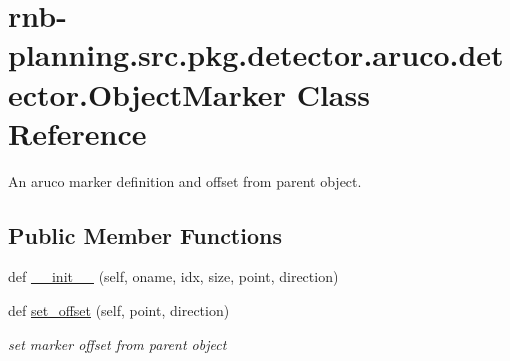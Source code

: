 \hypertarget{classrnb-planning_1_1src_1_1pkg_1_1detector_1_1aruco_1_1detector_1_1_object_marker}{}\section{rnb-\/planning.src.\+pkg.\+detector.\+aruco.\+detector.\+Object\+Marker Class Reference}
\label{classrnb-planning_1_1src_1_1pkg_1_1detector_1_1aruco_1_1detector_1_1_object_marker}


An aruco marker definition and offset from parent object.  


\subsection*{Public Member Functions}
\begin{DoxyCompactItemize}
\item 
def \hyperlink{classrnb-planning_1_1src_1_1pkg_1_1detector_1_1aruco_1_1detector_1_1_object_marker_a55945d45efeab4f582b908f31462b0b2}{\+\_\+\+\_\+init\+\_\+\+\_\+} (self, oname, idx, size, point, direction)
\item 
def \hyperlink{classrnb-planning_1_1src_1_1pkg_1_1detector_1_1aruco_1_1detector_1_1_object_marker_aa9cf3c15bacf6f72c451cfe136b37a4b}{set\+\_\+offset} (self, point, direction)
\begin{DoxyCompactList}\small\item\em set marker offset from parent object \end{DoxyCompactList}\end{DoxyCompactItemize}
